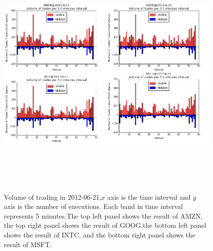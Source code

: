 \begin{figure}[hbtp]
  \begin{center}
    \includegraphics[width=6in,height=5in]{figures/volume_trade.png}
  \end{center}
\caption{Volume of trading in 2012-06-21,$x$ axis is the time interval and $y$ axis is the number of executions. Each band in time interval represents 5 minutes.The top left panel shows the result of AMZN, the top right panel shows the result of GOOG,the bottom left panel shows the result of INTC, and the bottom right panel shows the result of MSFT.  } \label{fig:volume_trade}
\end{figure}

